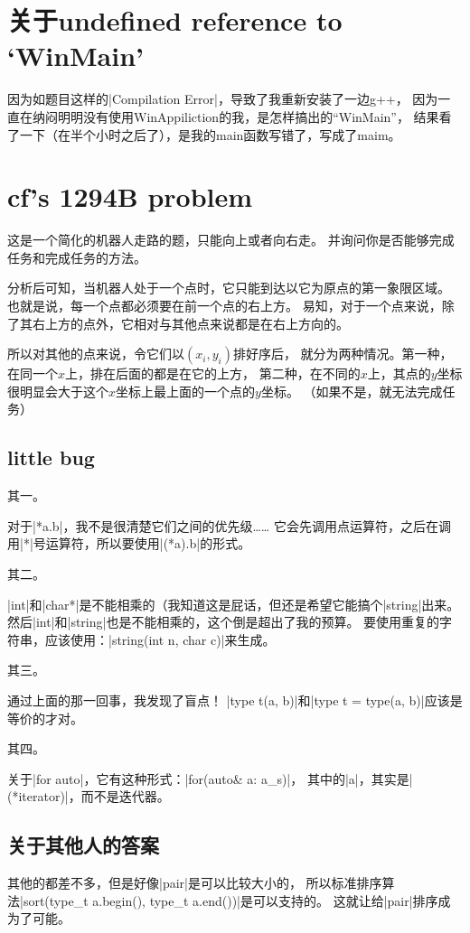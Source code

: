 
\section{关于undefined reference to `WinMain'}

因为如题目这样的\vb|Compilation Error|，导致了我重新安装了一边g++，
因为一直在纳闷明明没有使用WinAppiliction的我，是怎样搞出的``WinMain''，
结果看了一下（在半个小时之后了），是我的main函数写错了，写成了maim。


\section{cf's 1294B problem}

这是一个简化的机器人走路的题，只能向上或者向右走。
并询问你是否能够完成任务和完成任务的方法。

分析后可知，当机器人处于一个点时，它只能到达以它为原点的第一象限区域。
也就是说，每一个点都必须要在前一个点的右上方。
易知，对于一个点来说，除了其右上方的点外，它相对与其他点来说都是在右上方向的。

所以对其他的点来说，令它们以$(x_i, y_i)$排好序后，
就分为两种情况。第一种，在同一个$x$上，排在后面的都是在它的上方，
第二种，在不同的$x$上，其点的$y$坐标很明显会大于这个$x$坐标上最上面的一个点的$y$坐标。
（如果不是，就无法完成任务）

\subsection{little bug}
其一。

对于\vb|*a.b|，我不是很清楚它们之间的优先级\ldots\ldots
它会先调用点运算符，之后在调用\vb|*|号运算符，所以要使用\vb|(*a).b|的形式。

其二。

\vb|int|和\vb|char*|是不能相乘的（我知道这是屁话，但还是希望它能搞个\vb|string|出来。
然后\vb|int|和\vb|string|也是不能相乘的，这个倒是超出了我的预算。
要使用重复的字符串，应该使用：\vb|string(int n, char c)|来生成。

其三。

通过上面的那一回事，我发现了盲点！
\vb|type t(a, b)|和\vb|type t = type(a, b)|应该是等价的才对。

其四。

关于\vb|for auto|，它有这种形式：\vb|for(auto& a: a_s)|，
其中的\vb|a|，其实是\vb|(*iterator)|，而不是迭代器。

\subsection{关于其他人的答案}
其他的都差不多，但是好像\vb|pair|是可以比较大小的，
所以标准排序算法\vb|sort(type_t a.begin(), type_t a.end())|是可以支持的。
这就让给\vb|pair|排序成为了可能。



